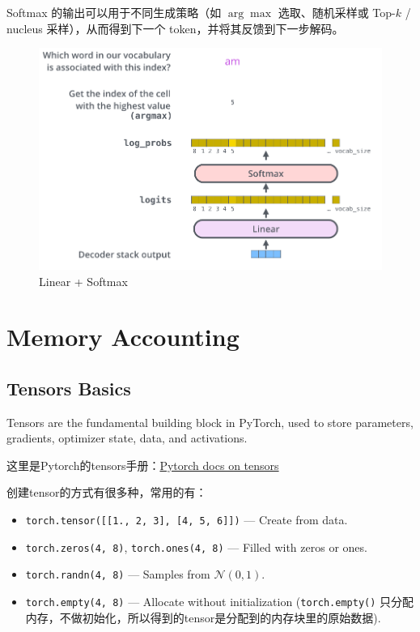 Softmax 的输出可以用于不同生成策略（如 $\arg\max$ 选取、随机采样或 Top-$k$ / nucleus 采样），从而得到下一个 token，并将其反馈到下一步解码。

\begin{figure}[htbp]
  \centering
  \includegraphics[width=0.9\linewidth]{figs/lec2/lec2.26.png}
  \caption{Linear + Softmax}
  \label{fig:Linear + Softmax}
\end{figure}









\clearpage
{\chaptoc\noindent\begin{minipage}[inner sep=0,outer sep=0]{0.9\linewidth}\section{Memory Accounting}\end{minipage}}

\subsection{Tensors Basics}
Tensors are the fundamental building block in PyTorch, used to store {\color{dblue}parameters, gradients, optimizer state, data, and activations}.

这里是Pytorch的tensors手册：\href{https://pytorch.org/docs/stable/tensors.html}{Pytorch docs on tensors}

创建tensor的方式有很多种，常用的有：
\begin{itemize}
    \item \texttt{torch.tensor([[1., 2, 3], [4, 5, 6]])} --- Create from data.
    \item \texttt{torch.zeros(4, 8)}, \texttt{torch.ones(4, 8)} --- Filled with zeros or ones.
    \item \texttt{torch.randn(4, 8)} --- Samples from $\mathcal{N}(0, 1)$.
    \item \texttt{torch.empty(4, 8)} --- Allocate without initialization (\texttt{torch.empty()} 只分配内存，不做初始化，所以得到的tensor是分配到的内存块里的原始数据).
\end{itemize}


